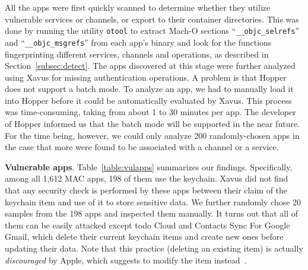\documentclass{article}
\newcommand{\ignore}[1]{}
\begin{document}
All the apps were first quickly scanned to determine whether they utilize vulnerable services or channels, or export to their container directories. This was done by running the utility \texttt{otool} to extract Mach-O sections ``\texttt{\_\_objc\_selrefs}'' and ``\texttt{\_\_objc\_msgrefs}'' from each app's binary and look for the functions fingerprinting different services, channels and operations, as described in Section~\ref{subsec:detect}.  The apps discovered at this stage were further analyzed using Xavus for missing authentication operations. A problem is that Hopper does not support a batch mode.  To analyze an app, we had to manually load it into Hopper before it could be automatically evaluated by Xavus. This process was time-consuming, taking from about 1 to 30 minutes per app.  The developer of Hopper informed us that the batch mode will be supported in the near future.  For the time being, however, we could only analyze 200 randomly-chosen apps in the case that more were found to be associated with a channel or a service.

\vspace {3pt}\noindent\textbf{Vulnerable apps}. \ignore{Running Xavus on our app collection, we discovered a large number of vulnerable apps.  }Table~\ref{table:vulapps} summarizes our findings. Specifically, among all 1,612 MAC apps, 198 of them use the keychain.  Xavus did not find that any security check is performed by these apps between their claim of the keychain item and use of it to store sensitive data.  We further randomly chose 20 samples from the 198 apps and inspected them manually. It turns out that all of them can be easily attacked except todo Cloud and Contacts Sync For Google Gmail, which delete their current keychain items and create new ones before updating their data. Note that this practice (deleting an existing item) is actually \textit{discouraged} by Apple, which suggests to modify the item instead~\cite{kcitemdelete}.
\end{document}
